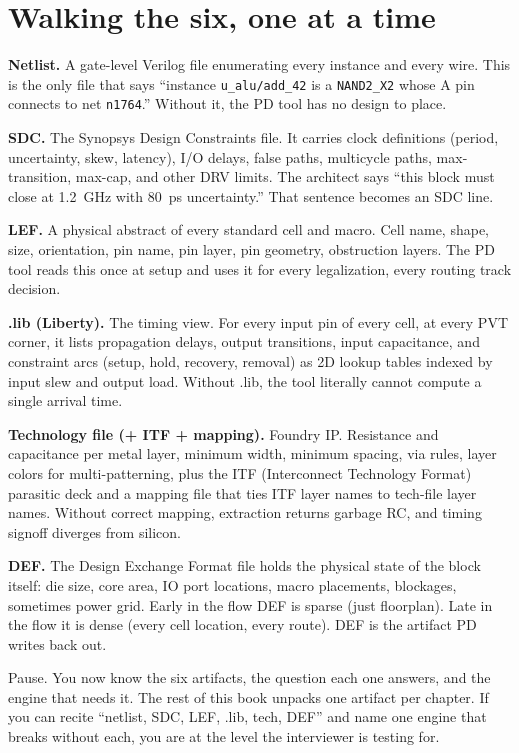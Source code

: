 \section{Walking the six, one at a time}

 \textbf{Netlist.} A gate-level Verilog file enumerating every instance and every wire. This is the only file that says ``instance \texttt{u\_alu/add\_42} is a \texttt{NAND2\_X2} whose A pin connects to net \texttt{n1764}.'' Without it, the PD tool has no design to place.

 \textbf{SDC.} The Synopsys Design Constraints file. It carries clock definitions (period, uncertainty, skew, latency), I/O delays, false paths, multicycle paths, max-transition, max-cap, and other DRV limits. The architect says ``this block must close at 1.2~GHz with 80~ps uncertainty.'' That sentence becomes an SDC line.

 \textbf{LEF.} A physical abstract of every standard cell and macro. Cell name, shape, size, orientation, pin name, pin layer, pin geometry, obstruction layers. The PD tool reads this once at setup and uses it for every legalization, every routing track decision.

 \textbf{.lib (Liberty).} The timing view. For every input pin of every cell, at every PVT corner, it lists propagation delays, output transitions, input capacitance, and constraint arcs (setup, hold, recovery, removal) as 2D lookup tables indexed by input slew and output load. Without .lib, the tool literally cannot compute a single arrival time.

 \textbf{Technology file (+ ITF + mapping).} Foundry IP. Resistance and capacitance per metal layer, minimum width, minimum spacing, via rules, layer colors for multi-patterning, plus the ITF (Interconnect Technology Format) parasitic deck and a mapping file that ties ITF layer names to tech-file layer names. Without correct mapping, extraction returns garbage RC, and timing signoff diverges from silicon.

 \textbf{DEF.} The Design Exchange Format file holds the physical state of the block itself: die size, core area, IO port locations, macro placements, blockages, sometimes power grid. Early in the flow DEF is sparse (just floorplan). Late in the flow it is dense (every cell location, every route). DEF is the artifact PD writes back out.

\begin{pausebox}
Pause. You now know the six artifacts, the question each one answers, and the engine that needs it. The rest of this book unpacks one artifact per chapter. If you can recite ``netlist, SDC, LEF, .lib, tech, DEF'' and name one engine that breaks without each, you are at the level the interviewer is testing for.
\end{pausebox}

